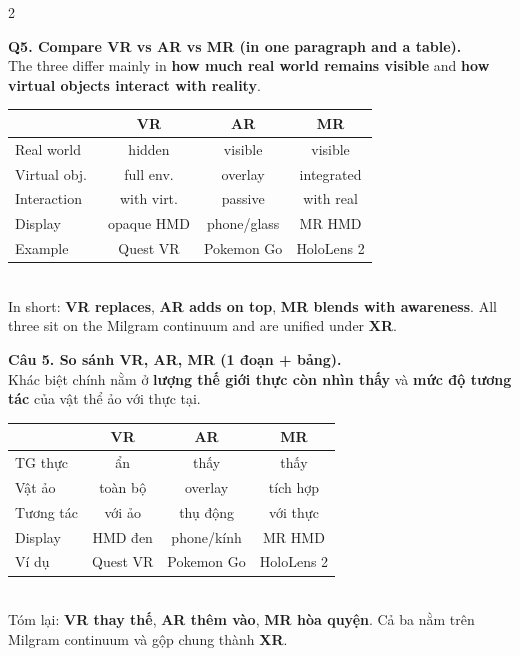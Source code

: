 \begin{paracol}{2}
\switchcolumn*

\textbf{Q5. Compare VR vs AR vs MR (in one paragraph and a table).}\\
The three differ mainly in \textbf{how much real world remains visible} and \textbf{how virtual objects interact with reality}.\\
\begin{tabular}{@{}lccc@{}}
\toprule
 & VR & AR & MR\\
\midrule
Real world & hidden & visible & visible\\
Virtual obj.\ & full env. & overlay & integrated\\
Interaction & with virt. & passive & with real\\
Display & opaque HMD & phone/glass & MR HMD\\
Example & Quest VR & Pokemon Go & HoloLens 2\\
\bottomrule
\end{tabular}\\
In short: \textbf{VR replaces}, \textbf{AR adds on top}, \textbf{MR blends with awareness}. All three sit on the Milgram continuum and are unified under \textbf{XR}.

\switchcolumn

\textbf{Câu 5. So sánh VR, AR, MR (1 đoạn + bảng).}\\
Khác biệt chính nằm ở \textbf{lượng thế giới thực còn nhìn thấy} và \textbf{mức độ tương tác} của vật thể ảo với thực tại.\\
\begin{tabular}{@{}lccc@{}}
\toprule
 & VR & AR & MR\\
\midrule
TG thực & ẩn & thấy & thấy\\
Vật ảo & toàn bộ & overlay & tích hợp\\
Tương tác & với ảo & thụ động & với thực\\
Display & HMD đen & phone/kính & MR HMD\\
Ví dụ & Quest VR & Pokemon Go & HoloLens 2\\
\bottomrule
\end{tabular}\\
Tóm lại: \textbf{VR thay thế}, \textbf{AR thêm vào}, \textbf{MR hòa quyện}. Cả ba nằm trên Milgram continuum và gộp chung thành \textbf{XR}.

\switchcolumn*


\end{paracol}
